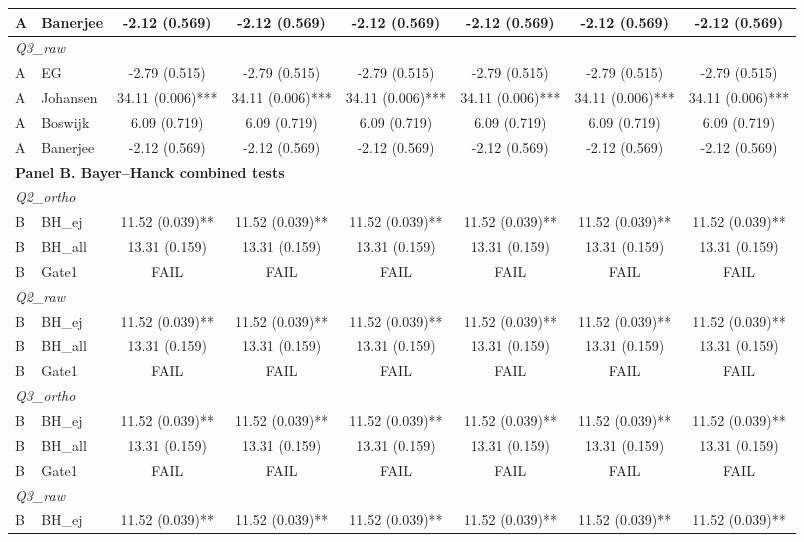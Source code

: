 \begin{table}[!ht]
\begin{tabular}{ll|cc|cc|cc}
\\
A & Banerjee & -2.12 (0.569) & -2.12 (0.569) & -2.12 (0.569) & -2.12 (0.569) & -2.12 (0.569) & -2.12 (0.569)
\\
\hline
\multicolumn{8}{l}{\textit{Q3\_raw}}\\
A & EG & -2.79 (0.515) & -2.79 (0.515) & -2.79 (0.515) & -2.79 (0.515) & -2.79 (0.515) & -2.79 (0.515)
\\
A & Johansen & 34.11 (0.006)*** & 34.11 (0.006)*** & 34.11 (0.006)*** & 34.11 (0.006)*** & 34.11 (0.006)*** & 34.11 (0.006)***
\\
A & Boswijk & 6.09 (0.719) & 6.09 (0.719) & 6.09 (0.719) & 6.09 (0.719) & 6.09 (0.719) & 6.09 (0.719)
\\
A & Banerjee & -2.12 (0.569) & -2.12 (0.569) & -2.12 (0.569) & -2.12 (0.569) & -2.12 (0.569) & -2.12 (0.569)
\\
\hline
\multicolumn{8}{l}{\textbf{Panel B. Bayer--Hanck combined tests}}\\
\hline
\multicolumn{8}{l}{\textit{Q2\_ortho}}\\
B & BH\_ej & 11.52 (0.039)** & 11.52 (0.039)** & 11.52 (0.039)** & 11.52 (0.039)** & 11.52 (0.039)** & 11.52 (0.039)**
\\
B & BH\_all & 13.31 (0.159) & 13.31 (0.159) & 13.31 (0.159) & 13.31 (0.159) & 13.31 (0.159) & 13.31 (0.159)
\\
B & Gate1 & FAIL & FAIL & FAIL & FAIL & FAIL & FAIL
\\
\hline
\multicolumn{8}{l}{\textit{Q2\_raw}}\\
B & BH\_ej & 11.52 (0.039)** & 11.52 (0.039)** & 11.52 (0.039)** & 11.52 (0.039)** & 11.52 (0.039)** & 11.52 (0.039)**
\\
B & BH\_all & 13.31 (0.159) & 13.31 (0.159) & 13.31 (0.159) & 13.31 (0.159) & 13.31 (0.159) & 13.31 (0.159)
\\
B & Gate1 & FAIL & FAIL & FAIL & FAIL & FAIL & FAIL
\\
\hline
\multicolumn{8}{l}{\textit{Q3\_ortho}}\\
B & BH\_ej & 11.52 (0.039)** & 11.52 (0.039)** & 11.52 (0.039)** & 11.52 (0.039)** & 11.52 (0.039)** & 11.52 (0.039)**
\\
B & BH\_all & 13.31 (0.159) & 13.31 (0.159) & 13.31 (0.159) & 13.31 (0.159) & 13.31 (0.159) & 13.31 (0.159)
\\
B & Gate1 & FAIL & FAIL & FAIL & FAIL & FAIL & FAIL
\\
\hline
\multicolumn{8}{l}{\textit{Q3\_raw}}\\
B & BH\_ej & 11.52 (0.039)** & 11.52 (0.039)** & 11.52 (0.039)** & 11.52 (0.039)** & 11.52 (0.039)** & 11.52 (0.039)**

\end{tabular}
\end{table}
